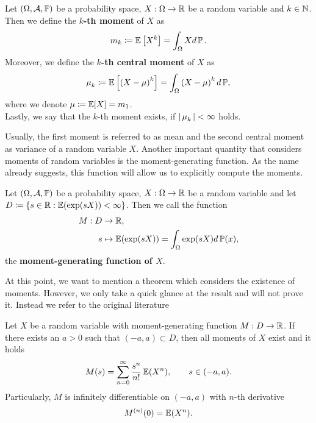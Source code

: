 \begin{definition}\label{def:moment}
Let $(\Omega,\operatorname{\mathcal{A}},\operatorname{\mathbb{P}})$ be a probability space, $X:\Omega \to \operatorname{\mathbb{R}}$ be a random variable and $k\in\operatorname{\mathbb{N}}$. Then we define the \textbf{$k$-th moment} of $X$ as
\begin{align*}
m_k \coloneqq \operatorname{\mathbb{E}} \left[X^k \right] = \int_\Omega Xd\operatorname{\mathbb{P}}.
\end{align*}
Moreover, we define the \textbf{$k$-th central moment} of $X$ as
\begin{align*}
\operatorname{\mu}_k \coloneqq \operatorname{\mathbb{E}} \left[\left(X - \operatorname{\mu} \right)^k \right] = \int_\Omega \left(X - \operatorname{\mu}\right)^k d\operatorname{\mathbb{P}},
\end{align*}
where we denote $\operatorname{\mu}\coloneqq\operatorname{\mathbb{E}}[X] = m_1$.\\
Lastly, we say that the $k$-th moment exists, if $|\operatorname{\mu}_k| < \infty$ holds.
\end{definition}

Usually, the first moment is referred to as mean and the second central moment as variance of a random variable $X$. Another important quantity that considers moments of random variables is the moment-generating function. As the name already suggests, this function will allow us to explicitly compute the moments.

\begin{definition}\label{def:moment_gen}
Let $(\Omega, \operatorname{\mathcal{A}}, \operatorname{\mathbb{P}})$ be a probability space, $X:\Omega\to \operatorname{\mathbb{R}}$ be a random variable and let $D\coloneqq \{ s\in\operatorname{\mathbb{R}}: \operatorname{\mathbb{E}}(\exp(sX))< \infty \}$. Then we call the function
\begin{align*}
M: D &\to \operatorname{\mathbb{R}},\\
s &\mapsto \operatorname{\mathbb{E}}(\exp(sX)) = \int_{\Omega} \exp(sX)d\operatorname{\mathbb{P}}(x),
\end{align*}
the \textbf{moment-generating function of $X$}.
\end{definition}

At this point, we want to mention a theorem which considers the existence of moments. However, we only take a quick glance at the result and will not prove it. Instead we refer to the original literature \cite[Theorem~4.21]{meintrup2006stochastik}
\begin{theorem}
Let $X$ be a random variable with moment-generating function $M:D\to\operatorname{\mathbb{R}}$. If there exists an $a>0$ such that $(-a, a)\subset D$, then all moments of $X$ exist and it holds
\begin{align*}
M(s) = \sum_{n=0}^\infty \frac{s^{n}}{n!} \operatorname{\mathbb{E}}(X^n), \qquad s \in (-a,a).
\end{align*}
Particularly, $M$ is infinitely differentiable on $(-a,a)$ with $n$-th derivative
\begin{align*}
M^{(n)}(0) = \operatorname{\mathbb{E}}(X^n).
\end{align*}
\end{theorem}


